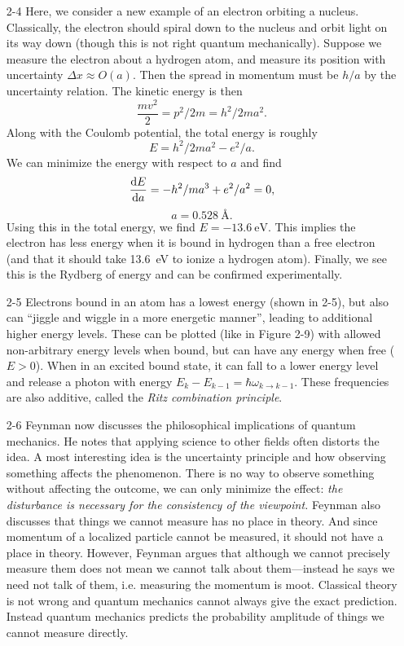 \documentclass{homework}
\begin{document}
\begin{enumerate}
		\item[2-4] Here, we consider a new example of an electron orbiting a nucleus. Classically, the electron should spiral down to the nucleus and orbit light on its way down (though this is not right quantum mechanically). Suppose we measure the electron about a hydrogen atom, and measure its position with uncertainty $\Delta x \approx O(a)$. Then the spread in momentum must be $h/a$ by the uncertainty relation. The kinetic energy is then $$\frac{mv^2}{2} = p^2 / 2m = h^2 / 2ma^2.$$ Along with the Coulomb potential, the total energy is roughly
		$$E = h^2 / 2ma^2 - e^2 / a.$$
		We can minimize the energy with respect to $a$ and find
		$$\dv{E}{a} = -h^2 / ma^3 + e^2 / a^2 = 0,$$
		$$a = \SI{0.528}{\angstrom}.$$
		Using this in the total energy, we find $E = \SI{-13.6}{\eV}$. This implies the electron has less energy when it is bound in hydrogen than a free electron (and that it should take \SI{13.6}{\eV} to ionize a hydrogen atom). Finally, we see this is the Rydberg of energy and can be confirmed experimentally.
		
		\item[2-5] Electrons bound in an atom has a lowest energy (shown in 2-5), but also can ``jiggle and wiggle in a more energetic manner'', leading to additional higher energy levels. These can be plotted (like in Figure 2-9) with allowed non-arbitrary energy levels when bound, but can have any energy when free ($E>0$). When in an excited bound state, it can fall to a lower energy level and release a photon with energy $E_k - E_{k-1} = \hbar \omega_{k \to k-1}$. These frequencies are also additive, called the \textit{Ritz combination principle}. 
		
		\item[2-6] Feynman now discusses the philosophical implications of quantum mechanics. He notes that applying science to other fields often distorts the idea. A most interesting idea is the uncertainty principle and how observing something affects the phenomenon. There is no way to observe something without affecting the outcome, we can only minimize the effect: \textit{the disturbance is necessary for the consistency of the viewpoint.} Feynman also discusses that things we cannot measure has no place in theory. And since momentum of a localized particle cannot be measured, it should not have a place in theory. However, Feynman argues that although we cannot precisely measure them does not mean we cannot talk about them---instead he says we need not talk of them, i.e. measuring the momentum is moot. Classical theory is not wrong and quantum mechanics cannot always give the exact prediction. Instead quantum mechanics predicts the probability amplitude of things we cannot measure directly. 
	\end{enumerate}
\end{document}
